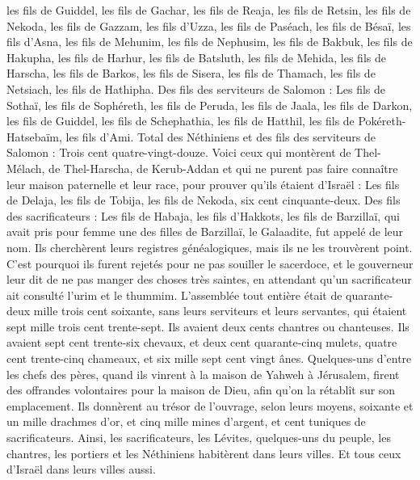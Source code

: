 \begin{multicols}{2}
les fils de Guiddel, les fils de Gachar, les fils de Reaja,
les fils de Retsin, les fils de Nekoda, les fils de Gazzam,
les fils d'Uzza, les fils de Paséach, les fils de Bésaï,
les fils d'Asna, les fils de Mehunim, les fils de Nephusim,
les fils de Bakbuk, les fils de Hakupha, les fils de Harhur,
les fils de Batsluth, les fils de Mehida, les fils de Harscha,
les fils de Barkos, les fils de Sisera, les fils de Thamach,
les fils de Netsiach, les fils de Hathipha.
Des fils des serviteurs de Salomon : Les fils de Sothaï, les fils de Sophéreth, les fils de Peruda,
les fils de Jaala, les fils de Darkon, les fils de Guiddel,
les fils de Schephathia, les fils de Hatthil, les fils de Pokéreth-Hatsebaïm, les fils d'Ami.
Total des Néthiniens et des fils des serviteurs de Salomon : Trois cent quatre-vingt-douze.
Voici ceux qui montèrent de Thel-Mélach, de Thel-Harscha, de Kerub-Addan et qui ne purent pas faire connaître leur maison paternelle et leur race, pour prouver qu’ils étaient d'Israël :
Les fils de Delaja, les fils de Tobija, les fils de Nekoda, six cent cinquante-deux.
Des fils des sacrificateurs : Les fils de Habaja, les fils d'Hakkots, les fils de Barzillaï, qui avait pris pour femme une des filles de Barzillaï, le Galaadite, fut appelé de leur nom.
Ils cherchèrent leurs registres généalogiques, mais ils ne les trouvèrent point. C'est pourquoi ils furent rejetés pour ne pas souiller le sacerdoce,
et le gouverneur leur dit de ne pas manger des choses très saintes, en attendant qu'un sacrificateur ait consulté l'urim et le thummim.
L’assemblée tout entière était de quarante-deux mille trois cent soixante,
sans leurs serviteurs et leurs servantes, qui étaient sept mille trois cent trente-sept. Ils avaient deux cents chantres ou chanteuses.
Ils avaient sept cent trente-six chevaux, et deux cent quarante-cinq mulets,
quatre cent trente-cinq chameaux, et six mille sept cent vingt ânes.
Quelques-uns d'entre les chefs des pères, quand ils vinrent à la maison de Yahweh à Jérusalem, firent des offrandes volontaires pour la maison de Dieu, afin qu'on la rétablît sur son emplacement.
Ils donnèrent au trésor de l'ouvrage, selon leurs moyens, soixante et un mille drachmes d'or, et cinq mille mines d'argent, et cent tuniques de sacrificateurs.
Ainsi, les sacrificateurs, les Lévites, quelques-uns du peuple, les chantres, les portiers et les Néthiniens habitèrent dans leurs villes. Et tous ceux d'Israël dans leurs villes aussi.

\end{multicols}

